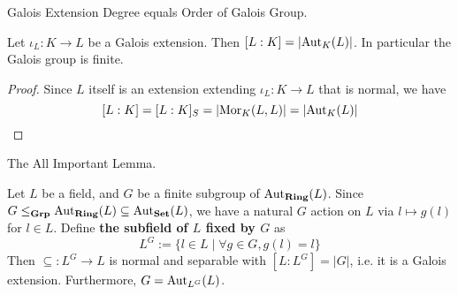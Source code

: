 \documentclass[../book.tex]{subfiles}
\begin{document}
\begin{thm} Galois Extension Degree equals Order of Galois Group.
    
    Let $\iota_L : K \to L$ be a Galois extension. 
    Then $[L : K] = |\text{Aut}_{K}(L)|$. In particular the Galois group is finite. 
\end{thm}
\begin{proof}
    Since $L$ itself is an extension extending $\iota_L : K \to L$ that is normal,
    we have \[
        [L : K] = [L : K]_S = |\text{Mor}_{K}(L, L)| = |\text{Aut}_{K}(L)|
    \]
\end{proof}
\begin{lem} The All Important Lemma.
    
    Let $L$ be a field, and $G$ be a finite subgroup of $\text{Aut}_{\mathbf{Ring}}(L)$. 
    Since $G \leq_{\mathbf{Grp}} \text{Aut}_{\mathbf{Ring}}(L) \subseteq \text{Aut}_{\mathbf{Set}}(L)$, 
    we have a natural $G$ action on $L$ via $l \mapsto g(l)$ for $l \in L$. 
    Define \textbf{the subfield of $L$ fixed by $G$} as
    \[ L^G := \{l \in L \mid \forall g \in G, g(l)=l\} \]
    Then $\subseteq : L^G \to L$ is normal and separable with $[L:L^G] = |G|$,
    i.e. it is a Galois extension. 
    Furthermore, $G = \text{Aut}_{L^G}(L)$.
\end{lem}
\end{document}
